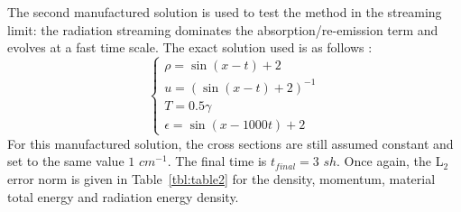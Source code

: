 \documentclass[review]{elsarticle}
\newcommand{\tbl}[1]{Table~\ref{#1}}                     %
\begin{document}
The second manufactured solution is used to test the method in the streaming limit: the radiation streaming dominates the absorption/re-emission term and evolves at a fast time scale. The exact solution used is as follows :
\begin{equation}
\label{eq:equation14}
\left\{
\begin{array}{llll}
\rho = \sin(x-t)+2 \\
u = \left( \sin(x-t)+2 \right)^{-1} \\
T = 0.5 \gamma \\
\epsilon = \sin(x-1000 t)+2
\end{array}
\right.
\end{equation}
For this manufactured solution, the cross sections are still assumed constant and set to the same value $1$ $cm^{-1}$. The final time is $t_{final}=3$ $sh$. Once again, the L$_2$ error norm is given in \tbl{tbl:table2} for the density, momentum, material total energy and radiation energy density.
\end{document}
